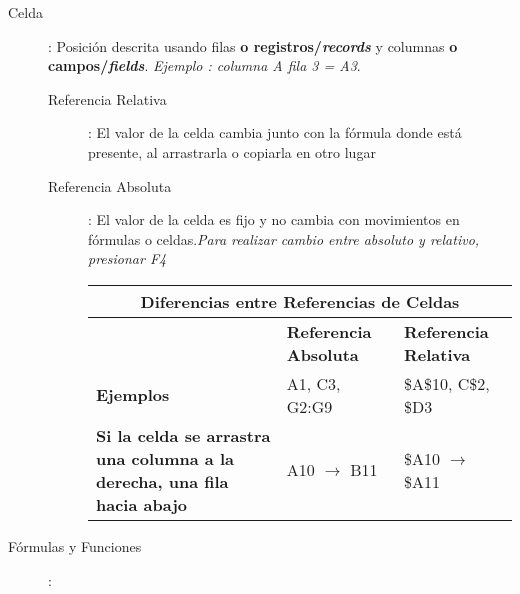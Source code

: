 \begin{description}
    \item[Celda]{ : Posición descrita usando filas \textbf{o registros/\textit{records}} y columnas \textbf{o campos/\textit{fields}}. \textit{Ejemplo : columna A fila 3 = A3}. 
    \begin{description}
        \item[Referencia Relativa]{ : El valor de la celda cambia junto con la fórmula donde está presente, al arrastrarla o copiarla en otro lugar}
        \item[Referencia Absoluta]{ : El valor de la celda es fijo y no cambia con movimientos en fórmulas o celdas.\textit{Para realizar cambio entre absoluto y relativo, presionar F4}}
        \begin{table}
            \centering
            \begin{tabular}{|p{5cm}|p{4.5cm}|p{4.5cm}|}
                \hline
                \multicolumn{3}{|c|}{Diferencias entre Referencias de Celdas} \\
                \hline
                & \textbf{Referencia Absoluta} & \textbf{Referencia Relativa} \\
                \hline
                \textbf{Ejemplos} & A1, C3, G2:G9 & \$A\$10, C\$2, \$D3 \\
                \hline
                \textbf{Si la celda se arrastra una columna a la derecha, una fila hacia abajo} & A10 $\rightarrow$ B11 & \$A10 $\rightarrow$ \$A11 \\
                \hline
            \end{tabular}
        \end{table}
    \end{description}}
    \item[Fórmulas y Funciones]{ : 
    }
\end{description}

